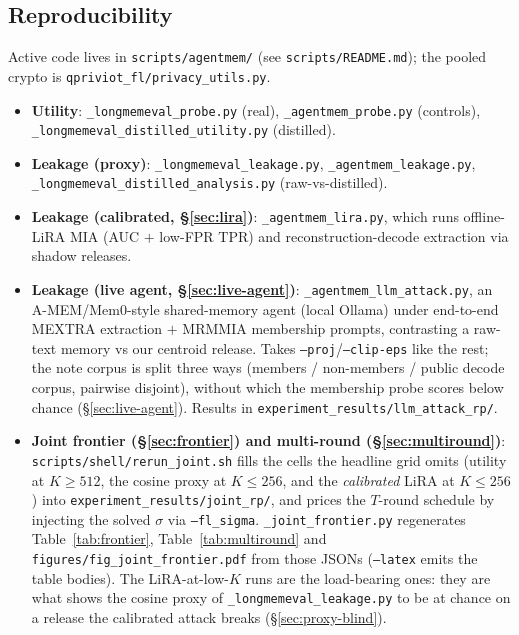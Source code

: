 \documentclass[pdflatex,sn-mathphys-num,12pt]{sn-jnl}
\theoremstyle{thmstyleone}%
\theoremstyle{thmstyletwo}%
\theoremstyle{thmstylethree}%
\newcommand{\secref}[1]{\S\ref{#1}}
\begin{document}
\begin{appendices}

\section{Reproducibility}\label{sec:repro}

Active code lives in \texttt{scripts/agentmem/} (see \texttt{scripts/README.md}); the pooled crypto is
\texttt{qpriviot\_fl/privacy\_utils.py}.

\begin{itemize}
  \item \textbf{Utility}: \texttt{\_longmemeval\_probe.py} (real),
    \texttt{\_agentmem\_probe.py} (controls),
    \texttt{\_longmemeval\_distilled\_utility.py} (distilled).
  \item \textbf{Leakage (proxy)}: \texttt{\_longmemeval\_leakage.py},
    \texttt{\_agentmem\_leakage.py}, \texttt{\_longmemeval\_distilled\_analysis.py}
    (raw-vs-distilled).
  \item \textbf{Leakage (calibrated, \secref{sec:lira})}: \texttt{\_agentmem\_lira.py}, which runs
    offline-LiRA MIA (AUC $+$ low-FPR TPR) and reconstruction-decode extraction via shadow releases.
  \item \textbf{Leakage (live agent, \secref{sec:live-agent})}: \texttt{\_agentmem\_llm\_attack.py},
    an A-MEM/Mem0-style shared-memory agent (local Ollama) under end-to-end MEXTRA extraction $+$
    MRMMIA membership prompts, contrasting a raw-text memory vs our centroid release. Takes
    \texttt{--proj}/\texttt{--clip-eps} like the rest; the note corpus is split three ways (members /
    non-members / public decode corpus, pairwise disjoint), without which the membership probe scores
    below chance (\secref{sec:live-agent}). Results in \texttt{experiment\_results/llm\_attack\_rp/}.
  \item \textbf{Joint frontier (\secref{sec:frontier}) and multi-round (\secref{sec:multiround})}:
    \texttt{scripts/shell/rerun\_joint.sh} fills the cells the headline grid omits (utility at
    $K \geq 512$, the cosine proxy at $K \leq 256$, and the \emph{calibrated} LiRA at
    $K \leq 256$) into \texttt{experiment\_results/joint\_rp/}, and prices the $T$-round
    schedule by injecting the solved $\sigma$ via \texttt{--fl\_sigma}.
    \texttt{\_joint\_frontier.py} regenerates Table~\ref{tab:frontier},
    Table~\ref{tab:multiround} and \texttt{figures/fig\_joint\_frontier.pdf} from those JSONs
    (\texttt{--latex} emits the table bodies). The LiRA-at-low-$K$ runs are the load-bearing
    ones: they are what shows the cosine proxy of \texttt{\_longmemeval\_leakage.py} to be at
    chance on a release the calibrated attack breaks (\secref{sec:proxy-blind}).


\end{itemize}
\end{appendices}
\end{document}
